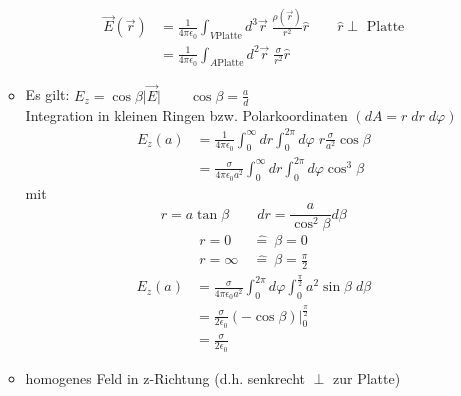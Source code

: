 \documentclass[titlepage,12pt,a4paper,ngerman]{report}
\newcommand{\tx}[1]{\textrm{#1}}
\begin{document}
\begin{itemize}
\begin{itemize}
\begin{align*}
\vec{E}(\vec{r}) &= \frac{1}{4 \pi \epsilon_0} \int_{V \tx{Platte}} d^3 \vec{r}\; \frac{\rho ( \vec{r})}{r^2} \hat{r}\qquad \hat{r} \perp \tx{ Platte}\\
&= \frac{1}{4\pi\epsilon_0} \int_{A \tx{Platte}} d^2 \vec{r} \; \frac{\sigma}{r^2} \hat{r}
\end{align*}

\item Es gilt: $E_z = \cos\beta \vert \vec{E} \vert \qquad \cos\beta = \frac{a}{d}$\\
Integration in kleinen Ringen bzw. Polarkoordinaten
$(dA = r \; dr \; d\varphi)$
\begin{align*}
E_z(a) &= \frac{1}{4\pi\epsilon_0} \int_0^\infty dr \int_0^{2\pi} d\varphi \; r \frac{\sigma}{a^2} \cos \beta\\[15pt]
&= \frac{\sigma}{4 \pi \epsilon_0a^2} \int_0^\infty dr \int_0^{2\pi} d\varphi \cos^3\beta
\end{align*}
mit $$ r=a\tan \beta\qquad dr = \frac{a}{\cos^2 \beta} d\beta $$
\begin{align*}
r=0 &\ \widehat{ = }\ \beta = 0\\
r=\infty &\ \widehat{ = }\ \beta = \frac{\pi}{2}
\end{align*}
\begin{align*}
E_z(a) &=  \frac{\sigma}{4 \pi \epsilon_0a^2} \int_0^{2\pi} d\varphi \int_0^{\frac{\pi}{2}} a^2 \sin\beta \; d\beta\\
&= \frac{\sigma}{2\epsilon_0} (-\cos\beta) \bigg|_{0}^{\frac{\pi}{2}}\\
&= \frac{\sigma}{2\epsilon_0}
\end{align*}
\item homogenes Feld in z-Richtung (d.h. senkrecht $\perp$ zur Platte)
\end{itemize}
\end{itemize}

\end{document}
